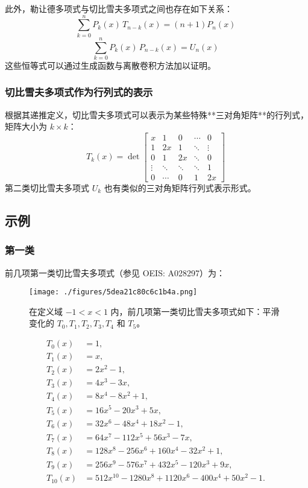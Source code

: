 此外，勒让德多项式与切比雪夫多项式之间也存在如下关系：
$$
\sum_{k=0}^{n} P_k(x)\, T_{n-k}(x) = (n + 1) P_n(x)~
$$
$$
\sum_{k=0}^{n} P_k(x)\, P_{n-k}(x) = U_n(x)~
$$
这些恒等式可以通过生成函数与离散卷积方法加以证明。
\subsubsection{切比雪夫多项式作为行列式的表示}
根据其递推定义，切比雪夫多项式可以表示为某些特殊**三对角矩阵**的行列式，矩阵大小为 $k \times k$：
$$
T_k(x) = \det
\begin{bmatrix}
x & 1 & 0 & \cdots & 0 \\
1 & 2x & 1 & \ddots & \vdots \\
0 & 1 & 2x & \ddots & 0 \\
\vdots & \ddots & \ddots & \ddots & 1 \\
0 & \cdots & 0 & 1 & 2x
\end{bmatrix}~
$$
第二类切比雪夫多项式 $U_k$ 也有类似的三对角矩阵行列式表示形式。
\subsection{示例}
\subsubsection{第一类}
前几项第一类切比雪夫多项式（参见 OEIS: A028297）为：
\begin{figure}[ht]
\centering
\texttt{[image: ./figures/5dea21c80c6c1b4a.png]}
\caption{在定义域 $-1 < x < 1$ 内，前几项第一类切比雪夫多项式如下：平滑变化的 $T_0, T_1, T_2, T_3, T_4$ 和 $T_5$。} \label{fig_QBXFdx_3}
\end{figure}
$$
\begin{aligned}
T_{0}(x)&=1,\\[1ex]
T_{1}(x)&=x,\\[1ex]
T_{2}(x)&=2x^{2}-1,\\[1ex]
T_{3}(x)&=4x^{3}-3x,\\[1ex]
T_{4}(x)&=8x^{4}-8x^{2}+1,\\[1ex]
T_{5}(x)&=16x^{5}-20x^{3}+5x,\\[1ex]
T_{6}(x)&=32x^{6}-48x^{4}+18x^{2}-1,\\[1ex]
T_{7}(x)&=64x^{7}-112x^{5}+56x^{3}-7x,\\[1ex]
T_{8}(x)&=128x^{8}-256x^{6}+160x^{4}-32x^{2}+1,\\[1ex]
T_{9}(x)&=256x^{9}-576x^{7}+432x^{5}-120x^{3}+9x,\\[1ex]
T_{10}(x)&=512x^{10}-1280x^{8}+1120x^{6}-400x^{4}+50x^{2}-1.
\end{aligned}~
$$
